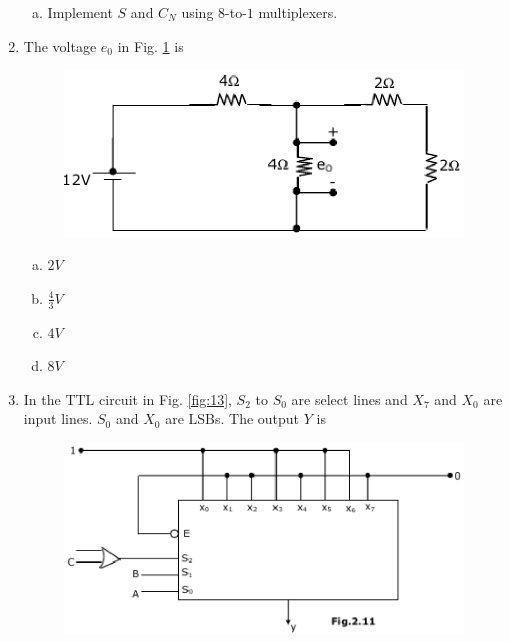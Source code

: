 \documentclass[journal,12pt,twocolumn]{IEEEtran}
\begin{document}
\begin{enumerate}
\begin{enumerate}[(a)]
\item Implement $S$ and $C_N$ using $8$-to-$1$ multiplexers.


\end{enumerate}


\item The voltage $e_0$ in Fig. \ref{fig:12} is


\begin{figure}

\centering

\includegraphics[width=\columnwidth]{./figs/16.eps}

\caption{}

\label{fig:12}

\end{figure} 


\begin{enumerate}[(a)]
 
\item $
2V
$

\item $
\frac{4}{3}V
$

\item $
4V
$

\item $
8V
$


\end{enumerate}

\item In the TTL circuit in Fig. \ref{fig:13}, $S_2$ to $S_0$ are select lines and $X_7$ and $X_0$ are input lines. $S_0$ and $X_0$ are LSBs. The output $Y$ is


\begin{figure}

\centering

\includegraphics[width=\columnwidth]{./figs/17.eps}


\end{figure}
\end{enumerate}
\end{document}
